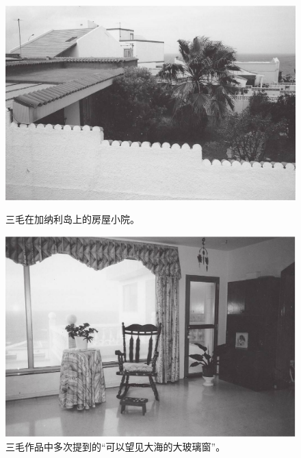\clearpage
\begin{figure}[htb]
    \centering %
    \includegraphics[scale=0.4]{picture/稻草人手记1.jpeg}
    \caption*{三毛在加纳利岛上的房屋小院。}
    \includegraphics[scale=0.4]{picture/稻草人手记2.jpeg}
    \caption*{三毛作品中多次提到的“可以望见大海的大玻璃窗”。}
\end{figure}
